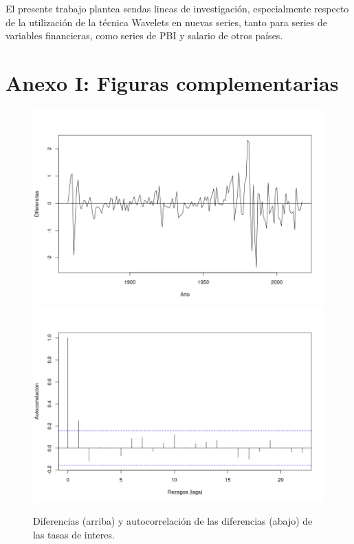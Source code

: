 \documentclass[a4paper]{article}
\begin{document}
El presente trabajo plantea sendas lineas de investigación, especialmente respecto de la utilización de la técnica Wavelets en nuevas series, tanto para series de variables financieras, como series de PBI y salario de otros países.







\renewcommand{\appendixname}{Anexos}
\renewcommand{\appendixtocname}{Anexos}
\renewcommand{\appendixpagename}{Anexos}

\appendix

\section{Anexo I: Figuras complementarias}
\begin{figure}[H]
	\centering
	\includegraphics[width=0.75\linewidth]{ir_diff.png}
	\includegraphics[width=0.75\linewidth]{ir_diff_acf.png}
	\caption{Diferencias (arriba) y autocorrelación de las diferencias (abajo) de las tasas de interes.} 	
	\label{fig:ir_diff_acf}
\end{figure}
\end{document}
